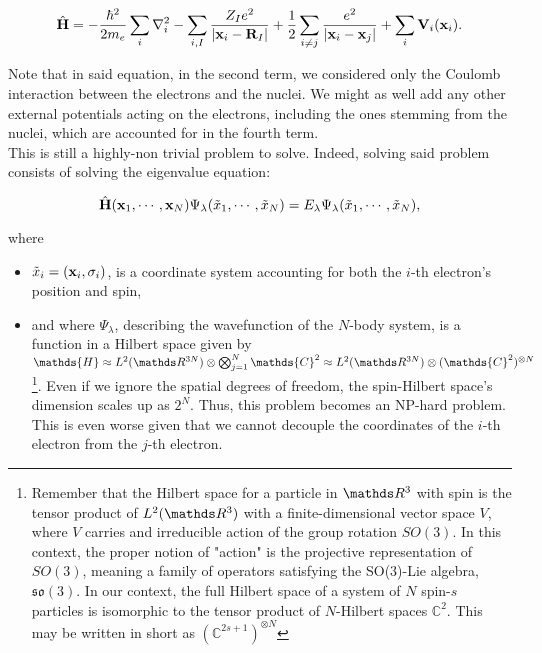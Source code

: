 \documentclass{homework}
\begin{document}
\begin{equation}
    \hat{\bf H} = -\frac{\hbar^2}{2m_e} \sum_i \nabla^2_i - \sum_{i, I} \frac{Z_I e^2}{|{\bf x}_i - {\bf R}_I|} + \frac{1}{2} \sum_{i \neq j} \frac{e^2}{|{\bf x}_i-{\bf x}_j|} + \sum_{i} {\bf V}_i ({\bf x}_i).
\label{simplified many-body Hamiltonian}
\end{equation}

Note that in said equation, in the second term, we considered only the Coulomb interaction between the electrons and the nuclei. We might as well add any other external potentials acting on the electrons, including the ones stemming from the nuclei, which are accounted for in the fourth term. \\

This is still a highly-non trivial problem to solve. Indeed, solving said problem consists of solving the eigenvalue equation:

\begin{equation}
\hat{\bf H}({\bf x}_1, \cdots, {\bf x}_N) \Psi_\lambda(\tilde{x}_1, \cdots, \tilde{x}_N) = E_\lambda \Psi_\lambda(\tilde{x}_1, \cdots, \tilde{x}_N),
\label{ev equation}
\end{equation}

where 

\begin{itemize}
    \item $\tilde{x}_i = ({\bf x}_i, \sigma_i)$, is a coordinate system accounting for both the $i$-th electron's position and spin,
    \item and where $\Psi_\lambda$, describing the wavefunction of the $N$-body system, is a function in a Hilbert space given by $\mathds{H} \approx L^2(\R^{3N}) \otimes \bigotimes_{j=1}^{N} \mathds{C}^2 \approx L^2(\R^{3N}) \otimes (\mathds{C}^{2})^{\otimes N}$\footnote{Remember that the Hilbert space for a particle in $\R^3$ with spin is the tensor product of $L^2(\R^3)$ with a finite-dimensional vector space $V$, where $V$ carries and irreducible action of the group rotation $SO(3)$. In this context, the proper notion of "action" is the projective representation of $SO(3)$, meaning a family of operators satisfying the SO(3)-Lie algebra, $\mathfrak{so}(3)$. In our context, the full Hilbert space of a system of $N$ spin-$s$ particles is isomorphic to the tensor product of $N$-Hilbert spaces $\mathds{C}^2$. This may be written in short as $(\mathds{C}^{2s+1})^{\otimes N}$}. Even if we ignore the spatial degrees of freedom, the spin-Hilbert space's dimension scales up as $2^N$. Thus, this problem becomes an NP-hard problem. This is even worse given that we cannot decouple the coordinates of the $i$-th electron from the $j$-th electron. \\ 
\end{itemize}
\end{document}
